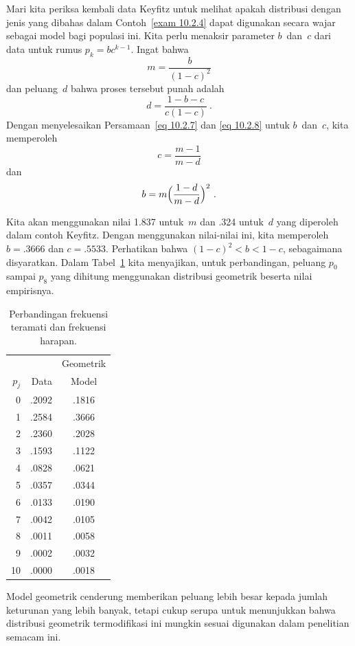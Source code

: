 \begin{example}\label{exam 10.2.4.5}
Mari kita periksa kembali data Keyfitz untuk melihat apakah distribusi dengan jenis yang
dibahas dalam Contoh~\ref{exam 10.2.4} dapat digunakan secara wajar sebagai model bagi
populasi ini.  Kita perlu menaksir parameter $b$~dan~$c$ dari data
untuk rumus $p_k = bc^{k - 1}$.  Ingat bahwa
\begin{equation}
m = \frac b{(1 - c)^2}  
\label{eq 10.2.7}
\end{equation}
dan peluang~$d$ bahwa proses tersebut punah adalah
\begin{equation}
d = \frac{1 - b - c}{c(1 - c)}\ .  \label{eq 10.2.8}
\end{equation}
Dengan menyelesaikan Persamaan~\ref{eq 10.2.7} dan \ref{eq 10.2.8} untuk $b$~dan~$c$, kita memperoleh
$$
c = \frac{m - 1}{m - d}
$$
\noindent dan
$$
b = m\Bigl(\frac{1 - d}{m - d}\Bigr)^2\ .
$$

Kita akan menggunakan nilai 1.837 untuk~$m$ dan .324 untuk~$d$ yang diperoleh dalam
contoh Keyfitz.  Dengan menggunakan nilai-nilai ini, kita memperoleh $b = .3666$ dan $c = .5533$. 
Perhatikan bahwa $(1 - c)^2 < b < 1 - c$, sebagaimana disyaratkan.  Dalam Tabel~\ref{table 10.3}
kita menyajikan, untuk
perbandingan, peluang $p_0$ sampai $p_8$ yang dihitung menggunakan distribusi geometrik
beserta nilai empirisnya.
\begin{table}
\centering                                   
\begin{tabular}{rrc}  \hline
    &           & Geometrik\\
$p_j$ &Data & Model   \\ \hline
0 & .2092 & .1816 \\
1 & .2584 & .3666 \\
2 & .2360 & .2028 \\
3 & .1593 & .1122 \\
4 & .0828 & .0621 \\
5 & .0357 & .0344 \\
6 & .0133 & .0190 \\
7 & .0042 & .0105 \\
8 & .0011 & .0058 \\
9 & .0002 & .0032 \\
10 & .0000 & .0018 \\\hline
\end{tabular}
\caption{Perbandingan frekuensi teramati dan frekuensi harapan.}
\label{table 10.3}
\end{table}
\par
Model geometrik cenderung memberikan peluang lebih besar kepada jumlah keturunan yang lebih banyak, tetapi
cukup serupa untuk menunjukkan bahwa distribusi geometrik termodifikasi ini mungkin
sesuai digunakan dalam penelitian semacam ini.


\end{example}
